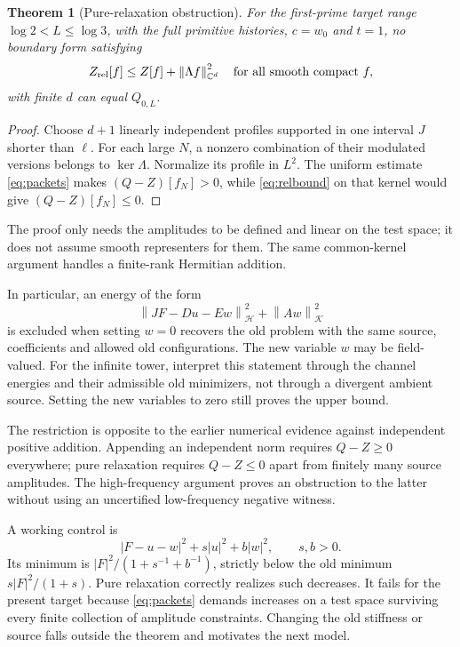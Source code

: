 \documentclass[11pt]{article}
\numberwithin{equation}{section}
\newtheorem{theorem}{Theorem}[section]
\theoremstyle{definition}
\theoremstyle{remark}
\newcommand{\C}{\mathbb C}
\newcommand{\norm}[1]{\left\lVert#1\right\rVert}
\begin{document}
\begin{theorem}[Pure-relaxation obstruction]
For the first-prime target range $\log2<L\le\log3$, with the full primitive histories, $c=w_0$ and $t=1$, no boundary form satisfying
\begin{equation}
 Z_{\rm rel}[f]\le Z[f]+\norm{\Lambda f}_{\C^d}^2
 \quad\text{for all smooth compact }f,
 \label{eq:relbound}
\end{equation}
with finite $d$ can equal $Q_{0,L}$.
\end{theorem}
\begin{proof}
Choose $d+1$ linearly independent profiles supported in one interval $J$ shorter than $\ell$. For each large $N$, a nonzero combination of their modulated versions belongs to $\ker\Lambda$. Normalize its profile in $L^2$. The uniform estimate \eqref{eq:packets} makes $(Q-Z)[f_N]>0$, while \eqref{eq:relbound} on that kernel would give $(Q-Z)[f_N]\le0$.
\end{proof}
The proof only needs the amplitudes to be defined and linear on the test space; it does not assume smooth representers for them. The same common-kernel argument handles a finite-rank Hermitian addition.

In particular, an energy of the form
\begin{equation}
 \norm{JF-Du-Ew}_{\mathcal H}^2+\norm{Aw}_{\mathcal K}^2
 \label{eq:purerel}
\end{equation}
is excluded when setting $w=0$ recovers the old problem with the same source, coefficients and allowed old configurations. The new variable $w$ may be field-valued. For the infinite tower, interpret this statement through the channel energies and their admissible old minimizers, not through a divergent ambient source. Setting the new variables to zero still proves the upper bound.

The restriction is opposite to the earlier numerical evidence against independent positive addition. Appending an independent norm requires $Q-Z\ge0$ everywhere; pure relaxation requires $Q-Z\le0$ apart from finitely many source amplitudes. The high-frequency argument proves an obstruction to the latter without using an uncertified low-frequency negative witness.

A working control is
\begin{equation}
 |F-u-w|^2+s|u|^2+b|w|^2,\qquad s,b>0.
\end{equation}
Its minimum is $|F|^2/(1+s^{-1}+b^{-1})$, strictly below the old minimum $s|F|^2/(1+s)$. Pure relaxation correctly realizes such decreases. It fails for the present target because \eqref{eq:packets} demands increases on a test space surviving every finite collection of amplitude constraints. Changing the old stiffness or source falls outside the theorem and motivates the next model.
\end{document}
